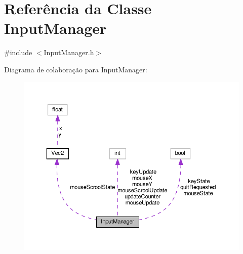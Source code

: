 \hypertarget{classInputManager}{\section{Referência da Classe Input\+Manager}
\label{classInputManager}
}


{\ttfamily \#include $<$Input\+Manager.\+h$>$}



Diagrama de colaboração para Input\+Manager\+:\nopagebreak
\begin{figure}[H]
\begin{center}
\leavevmode
\includegraphics[width=350pt]{classInputManager__coll__graph}
\end{center}
\end{figure}
